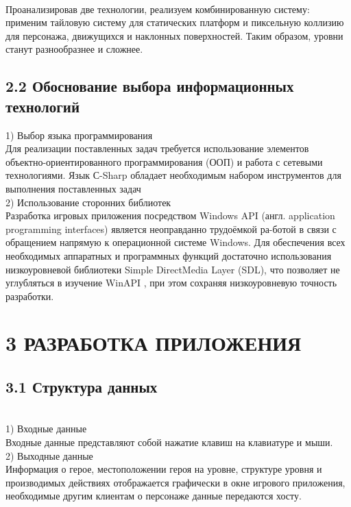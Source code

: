 \documentclass[14pt,a4paper]{extreport}
\begin{document}
\\Проанализировав две технологии, реализуем комбинированную систему: применим тайловую систему для статических платформ и пиксельную коллизию для персонажа, движущихся и наклонных поверхностей. Таким образом, уровни станут разнообразнее и сложнее.

	\subsection*{\normalsize\hspace{4ex}2.2 Обоснование выбора информационных технологий}
	\hspace{4ex}1)	Выбор языка программирования
\\Для реализации поставленных задач требуется использование элементов объектно-ориентированного программирования (ООП) и работа с сетевыми технологиями. Язык С-Sharp обладает необходимым набором инструментов для выполнения поставленных задач
\\2)	Использование сторонних библиотек
\\Разработка игровых приложения посредством Windows API (англ. application programming interfaces) является неоправданно трудоёмкой ра-ботой в связи с обращением напрямую к операционной системе Windows. Для обеспечения всех необходимых аппаратных и программных функций достаточно использования низкоуровневой библиотеки Simple DirectMedia Layer (SDL), что позволяет не углубляться в изучение WinAPI , при этом сохраняя низкоуровневую точность разработки.

	\newpage
	\section*{\normalsize\hspace{4ex}3 РАЗРАБОТКА ПРИЛОЖЕНИЯ}
	\subsection*{\normalsize\hspace{4ex}3.1 Структура данных}
	\hspace{4ex}
\\1)	Входные данные
\\Входные данные представляют собой нажатие клавиш на клавиатуре и мыши. 
\\2)	Выходные данные
\\Информация о герое, местоположении героя на уровне, структуре уровня и производимых действиях отображается графически в окне игрового приложения, необходимые другим клиентам о персонаже данные передаются хосту.
\end{document}
